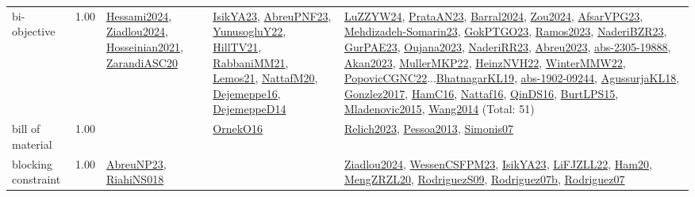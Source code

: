 {\begin{longtable}{p{3cm}r>{\raggedright\arraybackslash}p{6cm}>{\raggedright\arraybackslash}p{6cm}>{\raggedright\arraybackslash}p{8cm}}
\index{bi-objective}\index{Concepts!bi-objective}bi-objective &  1.00 & \hyperref[detail:Hessami2024]{Hessami2024}, \hyperref[detail:Ziadlou2024]{Ziadlou2024}, \hyperref[detail:Hosseinian2021]{Hosseinian2021}, \hyperref[detail:ZarandiASC20]{ZarandiASC20} & \hyperref[detail:IsikYA23]{IsikYA23}, \hyperref[detail:AbreuPNF23]{AbreuPNF23}, \hyperref[detail:YunusogluY22]{YunusogluY22}, \hyperref[detail:HillTV21]{HillTV21}, \hyperref[detail:RabbaniMM21]{RabbaniMM21}, \hyperref[detail:Lemos21]{Lemos21}, \hyperref[detail:NattafM20]{NattafM20}, \hyperref[detail:Dejemeppe16]{Dejemeppe16}, \hyperref[detail:DejemeppeD14]{DejemeppeD14} & \hyperref[detail:LuZZYW24]{LuZZYW24}, \hyperref[detail:PrataAN23]{PrataAN23}, \hyperref[detail:Barral2024]{Barral2024}, \hyperref[detail:Zou2024]{Zou2024}, \hyperref[detail:AfsarVPG23]{AfsarVPG23}, \hyperref[detail:Mehdizadeh-Somarin23]{Mehdizadeh-Somarin23}, \hyperref[detail:GokPTGO23]{GokPTGO23}, \hyperref[detail:Ramos2023]{Ramos2023}, \hyperref[detail:NaderiBZR23]{NaderiBZR23}, \hyperref[detail:GurPAE23]{GurPAE23}, \hyperref[detail:Oujana2023]{Oujana2023}, \hyperref[detail:NaderiRR23]{NaderiRR23}, \hyperref[detail:Abreu2023]{Abreu2023}, \hyperref[detail:abs-2305-19888]{abs-2305-19888}, \hyperref[detail:Akan2023]{Akan2023}, \hyperref[detail:MullerMKP22]{MullerMKP22}, \hyperref[detail:HeinzNVH22]{HeinzNVH22}, \hyperref[detail:WinterMMW22]{WinterMMW22}, \hyperref[detail:PopovicCGNC22]{PopovicCGNC22}...\hyperref[detail:BhatnagarKL19]{BhatnagarKL19}, \hyperref[detail:abs-1902-09244]{abs-1902-09244}, \hyperref[detail:AgussurjaKL18]{AgussurjaKL18}, \hyperref[detail:Gonzlez2017]{Gonzlez2017}, \hyperref[detail:HamC16]{HamC16}, \hyperref[detail:Nattaf16]{Nattaf16}, \hyperref[detail:QinDS16]{QinDS16}, \hyperref[detail:BurtLPS15]{BurtLPS15}, \hyperref[detail:Mladenovic2015]{Mladenovic2015}, \hyperref[detail:Wang2014]{Wang2014} (Total: 51)\\
\index{bill of material}\index{Concepts!bill of material}bill of material &  1.00 &  & \hyperref[detail:OrnekO16]{OrnekO16} & \hyperref[detail:Relich2023]{Relich2023}, \hyperref[detail:Pessoa2013]{Pessoa2013}, \hyperref[detail:Simonis07]{Simonis07}\\
\index{blocking constraint}\index{Concepts!blocking constraint}blocking constraint &  1.00 & \hyperref[detail:AbreuNP23]{AbreuNP23}, \hyperref[detail:RiahiNS018]{RiahiNS018} &  & \hyperref[detail:Ziadlou2024]{Ziadlou2024}, \hyperref[detail:WessenCSFPM23]{WessenCSFPM23}, \hyperref[detail:IsikYA23]{IsikYA23}, \hyperref[detail:LiFJZLL22]{LiFJZLL22}, \hyperref[detail:Ham20]{Ham20}, \hyperref[detail:MengZRZL20]{MengZRZL20}, \hyperref[detail:RodriguezS09]{RodriguezS09}, \hyperref[detail:Rodriguez07b]{Rodriguez07b}, \hyperref[detail:Rodriguez07]{Rodriguez07}\\

\end{longtable}}
